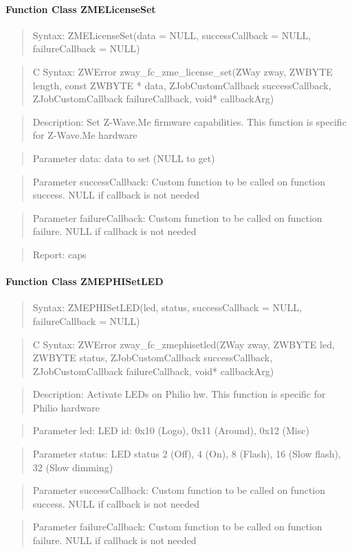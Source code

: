 \paragraph{Function Class ZMELicenseSet}
\begin{quote}Syntax: ZMELicenseSet(data = NULL, successCallback = NULL, failureCallback = NULL)\end{quote}
\begin{quote}C Syntax: ZWError zway\_fc\_zme\_license\_set(ZWay zway, ZWBYTE length, const ZWBYTE * data, ZJobCustomCallback successCallback, ZJobCustomCallback failureCallback, void* callbackArg)\end{quote}
\begin{quote}Description: Set Z-Wave.Me firmware capabilities. This function is specific for Z-Wave.Me hardware\end{quote}
\begin{quote}Parameter data: data to set (NULL to get)\end{quote}
\begin{quote}Parameter successCallback: Custom function to be called on function success. NULL if callback is not needed\end{quote}
\begin{quote}Parameter failureCallback: Custom function to be called on function failure. NULL if callback is not needed\end{quote}
\begin{quote}Report: caps\end{quote}

\paragraph{Function Class ZMEPHISetLED}
\begin{quote}Syntax: ZMEPHISetLED(led, status, successCallback = NULL, failureCallback = NULL)\end{quote}
\begin{quote}C Syntax: ZWError zway\_fc\_zmephisetled(ZWay zway, ZWBYTE led, ZWBYTE status, ZJobCustomCallback successCallback, ZJobCustomCallback failureCallback, void* callbackArg)\end{quote}
\begin{quote}Description: Activate LEDs on Philio hw. This function is specific for Philio hardware\end{quote}
\begin{quote}Parameter led: LED id: 0x10 (Logo), 0x11 (Around), 0x12 (Misc)\end{quote}
\begin{quote}Parameter status: LED status 2 (Off), 4 (On), 8 (Flash), 16 (Slow flash), 32 (Slow dimming)\end{quote}
\begin{quote}Parameter successCallback: Custom function to be called on function success. NULL if callback is not needed\end{quote}
\begin{quote}Parameter failureCallback: Custom function to be called on function failure. NULL if callback is not needed\end{quote}


